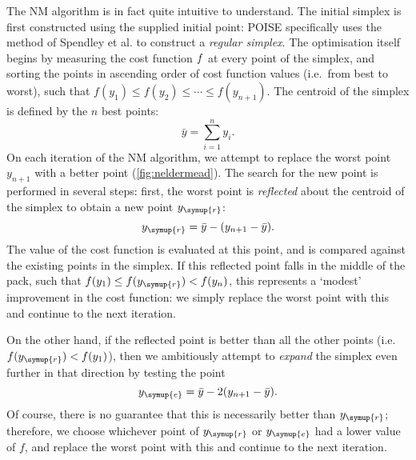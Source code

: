 The NM algorithm is in fact quite intuitive to understand.
The initial simplex is first constructed using the supplied initial point: POISE specifically uses the method of Spendley et al.\autocite{Spendley1962T} to construct a \textit{regular simplex}.
The optimisation itself begins by measuring the cost function $f\/$ at every point of the simplex, and sorting the points in ascending order of cost function values (i.e.\ from best to worst), such that $f(y_1) \leq f(y_2) \leq \cdots \leq f(y_{n+1})$.
The centroid of the simplex is defined by the $n$ best points:
\begin{equation}
    \label{eq:simplex_centroid}
    \bar{y} = \sum_{i=1}^n y_i.
\end{equation}
On each iteration of the NM algorithm, we attempt to replace the worst point $y_{n+1}$  with a better point (\cref{fig:neldermead}).
The search for the new point is performed in several steps: first, the worst point is \textit{reflected} about the centroid of the simplex to obtain a new point $y_{\symup{r}}$:
\begin{equation}
    \label{eq:nm_reflect}
    y_{\symup{r}} = \bar{y} - (y_{n+1} - \bar{y}).
\end{equation}
The value of the cost function is evaluated at this point, and is compared against the existing points in the simplex.
If this reflected point falls in the middle of the pack, such that $f(y_1) \leq f(y_{\symup{r}}) < f(y_n)$, this represents a `modest' improvement in the cost function: we simply replace the worst point with this and continue to the next iteration.

On the other hand, if the reflected point is better than all the other points (i.e.\ $f(y_{\symup{r}}) < f(y_1)$), then we ambitiously attempt to \textit{expand} the simplex even further in that direction by testing the point
\begin{equation}
    \label{eq:nm_expand}
    y_{\symup{e}} = \bar{y} - 2(y_{n+1} - \bar{y}).
\end{equation}
Of course, there is no guarantee that this is necessarily better than $y_{\symup{r}}$; therefore, we choose whichever point of $y_{\symup{r}}$ or $y_{\symup{e}}$ had a lower value of $f$, and replace the worst point with this and continue to the next iteration.


